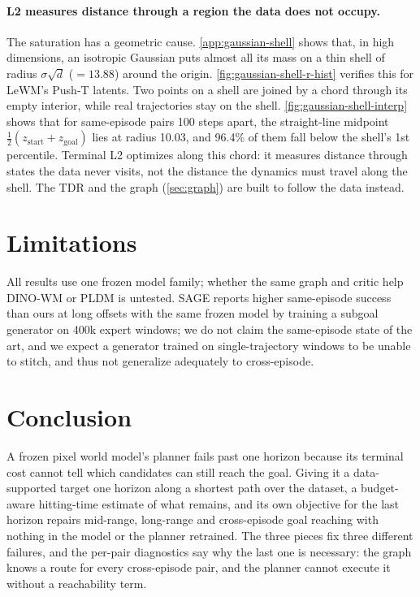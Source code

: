 \documentclass{article} %
\newcommand{\keypoints}[1]{\par\medskip\noindent\fcolorbox{black!50}{black!5}{\begin{minipage}{0.96\linewidth}\small
\textbf{Key points this section must land.}\begin{itemize}[nosep,leftmargin=1.2em]#1\end{itemize}\end{minipage}}\par\medskip}
\begin{document}
\paragraph{L2 measures distance through a region the data does not occupy.}
The saturation has a geometric cause. \cref{app:gaussian-shell} shows that, in high dimensions, an isotropic Gaussian puts almost all
its mass on a thin shell of radius $\sigma\sqrt d$ ($=13.88$) around the origin. \cref{fig:gaussian-shell-r-hist} verifies this for LeWM's Push-T
latents. Two points on a shell are joined by a chord
through its empty interior, while real trajectories stay on the shell. \cref{fig:gaussian-shell-interp} shows that for same-episode
pairs 100 steps apart, the
straight-line midpoint $\tfrac12(z_{\mathrm{start}}+z_{\mathrm{goal}})$ lies at radius 10.03, and
96.4\% of them fall below the shell's 1st percentile. Terminal L2
optimizes along this chord: it measures distance through states the data never visits, not the distance
the dynamics must travel along the shell. The TDR and the graph (\cref{sec:graph}) are built to
follow the data instead.


\section{Limitations}
\label{sec:limitations}
All results use one frozen model
family; whether the same graph and critic help DINO-WM or PLDM is untested. SAGE \citep{sage}
reports higher same-episode success than ours at long offsets with the same frozen model by
training a subgoal generator on 400k expert windows; we do not claim the same-episode state of the
art, and we expect a generator trained on single-trajectory windows to be unable to stitch, and thus not generalize adequately to cross-episode.

\section{Conclusion}
A frozen pixel world model's planner fails past one horizon because its terminal cost cannot tell
which candidates can still reach the goal. Giving it a data-supported target one horizon along a
shortest path over the dataset, a budget-aware hitting-time estimate of what remains, and its own
objective for the last horizon repairs mid-range, long-range and cross-episode goal reaching with
nothing in the model or the planner retrained. The three pieces fix three different failures, and
the per-pair diagnostics say why the last one is necessary: the graph knows a route for every
cross-episode pair, and the planner cannot execute it without a reachability term.
\end{document}
